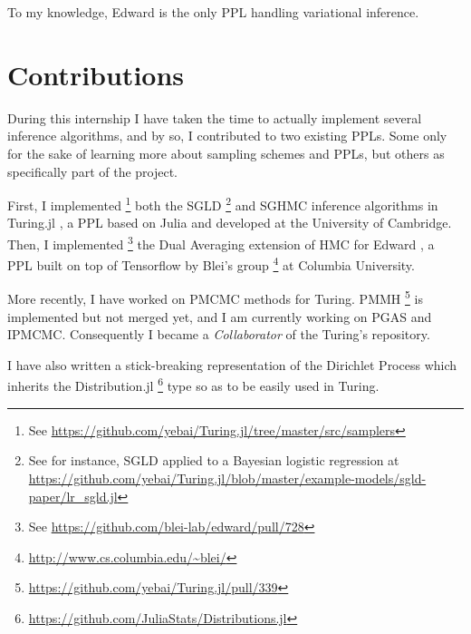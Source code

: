 To my knowledge, Edward \cite{Edward} is the only \gls{PPL} handling variational inference.

\section{Contributions}
During this internship I have taken the time to actually implement several inference algorithms, and by so, I contributed to two existing \glspl{PPL}.
Some only for the sake of learning more about sampling schemes and \glspl{PPL}, but others as specifically part of the project. 

First, I implemented \footnote{See \url{https://github.com/yebai/Turing.jl/tree/master/src/samplers}} both the \gls{SGLD} \footnote{See for instance, \gls{SGLD} applied to a Bayesian logistic regression at \url{https://github.com/yebai/Turing.jl/blob/master/example-models/sgld-paper/lr_sgld.jl}} and \gls{SGHMC} inference algorithms in Turing.jl \cite{Turing}, a \gls{PPL} based on Julia \cite{Bezanson:2017gd} and developed at the University of Cambridge.
Then, I implemented \footnote{See \url{https://github.com/blei-lab/edward/pull/728}} the Dual Averaging extension \cite{NUTS} of \gls{HMC} for Edward \cite{Edward}, a \gls{PPL} built on top of Tensorflow \cite{Tensorflow} by Blei's group \footnote{\url{http://www.cs.columbia.edu/~blei/}} at Columbia University.

More recently, I have worked on \gls{PMCMC} methods for Turing. \Gls{PMMH} \footnote{\url{https://github.com/yebai/Turing.jl/pull/339}} is implemented but not merged yet, and I am currently working on \gls{PGAS} and \gls{IPMCMC}. Consequently I became a \textit{Collaborator} of the Turing's repository.

I have also written a stick-breaking representation of the Dirichlet Process which inherits the Distribution.jl \footnote{\url{https://github.com/JuliaStats/Distributions.jl}} type so as to be easily used in Turing.
